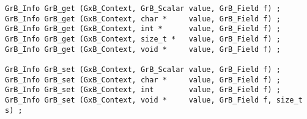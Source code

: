 \begin{mdframed}[userdefinedwidth=6in]
{\footnotesize
\begin{verbatim}
GrB_Info GrB_get (GxB_Context, GrB_Scalar value, GrB_Field f) ;
GrB_Info GrB_get (GxB_Context, char *     value, GrB_Field f) ;
GrB_Info GrB_get (GxB_Context, int *      value, GrB_Field f) ;
GrB_Info GrB_get (GxB_Context, size_t *   value, GrB_Field f) ;
GrB_Info GrB_get (GxB_Context, void *     value, GrB_Field f) ;

GrB_Info GrB_set (GxB_Context, GrB_Scalar value, GrB_Field f) ;
GrB_Info GrB_set (GxB_Context, char *     value, GrB_Field f) ;
GrB_Info GrB_set (GxB_Context, int        value, GrB_Field f) ;
GrB_Info GrB_set (GxB_Context, void *     value, GrB_Field f, size_t s) ;
\end{verbatim}
}\end{mdframed}

